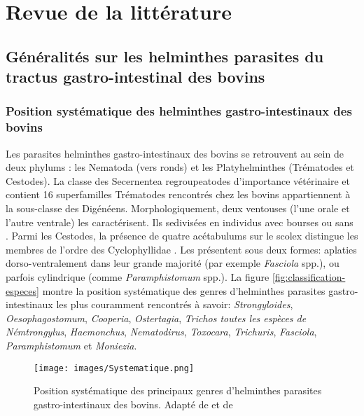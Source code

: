 \chapter{Revue de la littérature}

\section{Généralités sur les helminthes parasites du tractus gastro-intestinal des bovins}
\subsection{Position systématique des helminthes gastro-intestinaux des bovins}

Les parasites helminthes gastro-intestinaux des bovins se retrouvent au sein de deux phylums : 
les Nematoda (vers ronds) et les Platyhelminthes (Trématodes et Cestodes). La classe des 
Secernentea regroupeatodes d'importance vétérinaire et contient 
16 superfamilles Trématodes rencontrés chez les bovins appartiennent 
à la sous-classe des Digénéens. Morphologiquement, deux ventouses (l'une orale et l'autre 
ventrale) les caractérisent. Ils sedivisées en individus avec bourses ou sans . Parmi les 
Cestodes, la présence de quatre acétabulums sur le scolex distingue les membres de l'ordre 
des Cyclophyllidae . Les  présentent sous deux formes: aplaties dorso-ventralement 
dans leur grande majorité (par exemple \textit{Fasciola} spp.), ou parfois cylindrique 
(comme \textit{Paramphistomum} spp.). La figure \ref{fig:classification-especes}  montre 
la position systématique des genres d'helminthes parasites gastro-intestinaux les plus 
couramment rencontrés à savoir: \textit{Strongyloides}, \textit{Oesophagostomum}, 
\textit{Cooperia}, \textit{Ostertagia}, \textit{Trichos toutes les espèces de Némtrongylus}, \textit{Haemonchus}, 
\textit{Nematodirus}, \textit{Toxocara}, \textit{Trichuris}, \textit{Fasciola}, 
\textit{Paramphistomum} et \textit{Moniezia}.

\begin{figure}
	\centering
	\texttt{[image: images/Systematique.png]}
	\caption[Position systématique des principaux genres d'helminthes parasites 
	gastro-intestinaux des bovins]{\label{fig:classification-especes}Position systématique 
	des principaux genres d'helminthes parasites gastro-intestinaux des bovins. Adapté de
		 et de }
	\label{fig:systematique}
\end{figure}

